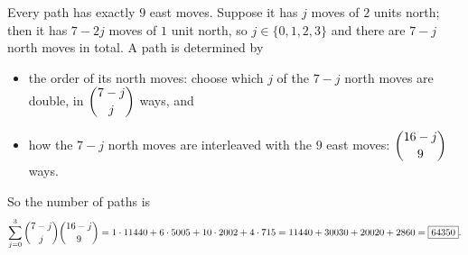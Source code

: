 Every path has exactly $9$ east moves. Suppose it has $j$ moves of $2$ units north; then it has $7-2j$ moves of $1$ unit north, so $j\in\{0,1,2,3\}$ and there are $7-j$ north moves in total. A path is determined by
\begin{itemize}
\item the order of its north moves: choose which $j$ of the $7-j$ north moves are double, in $\dbinom{7-j}{j}$ ways, and
\item how the $7-j$ north moves are interleaved with the $9$ east moves: $\dbinom{16-j}{9}$ ways.
\end{itemize}
So the number of paths is
\[\sum_{j=0}^{3}\dbinom{7-j}{j}\dbinom{16-j}{9}=1\cdot11440+6\cdot5005+10\cdot2002+4\cdot715=11440+30030+20020+2860=\boxed{64350}.\]
